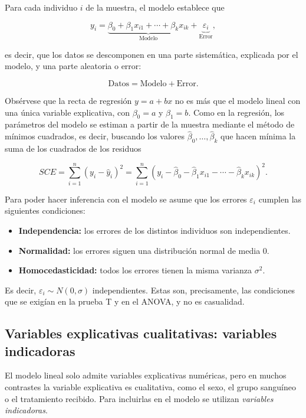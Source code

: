 \documentclass[
  spanish,
  a4paper,
]{scrreport}
\providecommand{\tightlist}{%
  \setlength{\itemsep}{0pt}\setlength{\parskip}{0pt}}
\theoremstyle{plain}
\theoremstyle{definition}
\theoremstyle{definition}
\theoremstyle{remark}
\begin{document}
Para cada individuo \(i\) de la muestra, el modelo establece que

\[
y_i = \underbrace{\beta_0 + \beta_1 x_{i1} + \cdots + \beta_k x_{ik}}_{\text{Modelo}} + \underbrace{\varepsilon_i}_{\text{Error}},
\]

es decir, que los datos se descomponen en una parte sistemática,
explicada por el modelo, y una parte aleatoria o error:

\[
\text{Datos} = \text{Modelo} + \text{Error}.
\]

Obsérvese que la recta de regresión \(y=a+bx\) no es más que el modelo
lineal con una única variable explicativa, con \(\beta_0=a\) y
\(\beta_1=b\). Como en la regresión, los parámetros del modelo se
estiman a partir de la muestra mediante el método de mínimos cuadrados,
es decir, buscando los valores \(\hat\beta_0,\ldots,\hat\beta_k\) que
hacen mínima la suma de los cuadrados de los residuos

\[
SCE = \sum_{i=1}^n (y_i-\hat y_i)^2 = \sum_{i=1}^n (y_i - \hat\beta_0 - \hat\beta_1 x_{i1} - \cdots - \hat\beta_k x_{ik})^2.
\]

Para poder hacer inferencia con el modelo se asume que los errores
\(\varepsilon_i\) cumplen las siguientes condiciones:

\begin{itemize}
\tightlist
\item
  \textbf{Independencia:} los errores de los distintos individuos son
  independientes.
\item
  \textbf{Normalidad:} los errores siguen una distribución normal de
  media 0.
\item
  \textbf{Homocedasticidad:} todos los errores tienen la misma varianza
  \(\sigma^2\).
\end{itemize}

Es decir, \(\varepsilon_i\sim N(0,\sigma)\) independientes. Estas son,
precisamente, las condiciones que se exigían en la prueba T y en el
ANOVA, y no es casualidad.

\subsection{Variables explicativas cualitativas: variables
indicadoras}\label{variables-explicativas-cualitativas-variables-indicadoras}

El modelo lineal solo admite variables explicativas numéricas, pero en
muchos contrastes la variable explicativa es cualitativa, como el sexo,
el grupo sanguíneo o el tratamiento recibido. Para incluirlas en el
modelo se utilizan \emph{variables indicadoras}.
\end{document}
